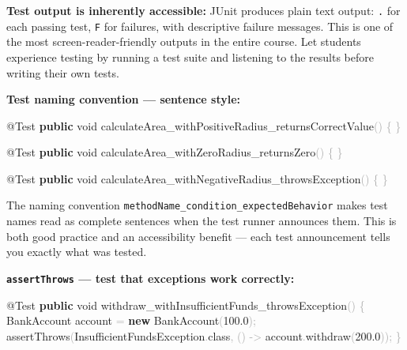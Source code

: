 \documentclass[
  justified,
  openright,
]{tufte-book}
\newcommand{\KeywordTok}[1]{\textcolor{CodeKeyword}{\textbf{#1}}}  %
\newcommand{\CodeNumTok}[1]{\textcolor{CodeNumber}{#1}}             %
\newcommand{\CodeFuncTok}[1]{\textcolor{CodeKeyword}{#1}}           %
\newcommand{\CodeTypeTok}[1]{\textcolor{CodeType}{#1}}              %
\newcommand{\OperatorTok}[1]{\textcolor{DarkGray}{#1}}              %
\newenvironment{Shaded}{%
  \begin{mdframed}[style=TufteCode]%
}{%
  \end{mdframed}%
}
\begin{document}
\textbf{Test output is inherently accessible:} JUnit produces plain text
output: \texttt{.} for each passing test, \texttt{F} for failures, with
descriptive failure messages. This is one of the most
screen-reader-friendly outputs in the entire course. Let students
experience testing by running a test suite and listening to the results
before writing their own tests.

\textbf{Test naming convention --- sentence style:}

\begin{Shaded}
\begin{Highlighting}[]
\CodeTypeTok{@Test}
\KeywordTok{public} \CodeTypeTok{void} \CodeFuncTok{calculateArea\_withPositiveRadius\_returnsCorrectValue}\OperatorTok{()} \OperatorTok{\{} \OperatorTok{\}}
 
\CodeTypeTok{@Test}
\KeywordTok{public} \CodeTypeTok{void} \CodeFuncTok{calculateArea\_withZeroRadius\_returnsZero}\OperatorTok{()} \OperatorTok{\{} \OperatorTok{\}}
 
\CodeTypeTok{@Test}
\KeywordTok{public} \CodeTypeTok{void} \CodeFuncTok{calculateArea\_withNegativeRadius\_throwsException}\OperatorTok{()} \OperatorTok{\{} \OperatorTok{\}}
\end{Highlighting}
\end{Shaded}

The naming convention \texttt{methodName\_condition\_expectedBehavior}
makes test names read as complete sentences when the test runner
announces them. This is both good practice and an accessibility benefit
--- each test announcement tells you exactly what was tested.

\textbf{\texttt{assertThrows} --- test that exceptions work correctly:}

\begin{Shaded}
\begin{Highlighting}[]
\CodeTypeTok{@Test}
\KeywordTok{public} \CodeTypeTok{void} \CodeFuncTok{withdraw\_withInsufficientFunds\_throwsException}\OperatorTok{()} \OperatorTok{\{}
    BankAccount account \OperatorTok{=} \KeywordTok{new} \CodeFuncTok{BankAccount}\OperatorTok{(}\CodeNumTok{100.0}\OperatorTok{);}
    \CodeFuncTok{assertThrows}\OperatorTok{(}InsufficientFundsException\OperatorTok{.}\CodeFuncTok{class}\OperatorTok{,} \OperatorTok{()} \OperatorTok{{-}\textgreater{}} account\OperatorTok{.}\CodeFuncTok{withdraw}\OperatorTok{(}\CodeNumTok{200.0}\OperatorTok{));}
\OperatorTok{\}}
\end{Highlighting}
\end{Shaded}
\end{document}
